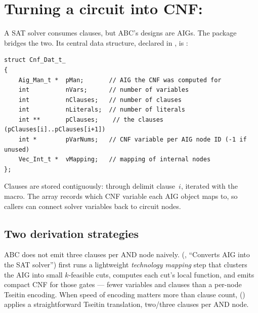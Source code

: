\section{Turning a circuit into CNF: }

A SAT solver consumes clauses, but ABC's designs are AIGs. The 
package bridges the two. Its central data structure, declared in
, is :

\begin{lstlisting}[style=abccode]
struct Cnf_Dat_t_
{
    Aig_Man_t *  pMan;       // AIG the CNF was computed for
    int          nVars;      // number of variables
    int          nClauses;   // number of clauses
    int          nLiterals;  // number of literals
    int **       pClauses;    // the clauses (pClauses[i]..pClauses[i+1])
    int *        pVarNums;   // CNF variable per AIG node ID (-1 if unused)
    Vec_Int_t *  vMapping;   // mapping of internal nodes
};
\end{lstlisting}

Clauses are stored contiguously:  through 
delimit clause~$i$, iterated with the  macro. The
 array records which CNF variable each AIG object maps to, so callers
can connect solver variables back to circuit nodes.

\subsection{Two derivation strategies}

ABC does not emit three clauses per AND node naively. 
(, ``Converts AIG into the SAT solver'') first runs a
lightweight \emph{technology mapping} step that clusters the AIG into small
$k$-feasible cuts, computes each cut's local function, and emits compact CNF for
those gates --- fewer variables and clauses than a per-node Tseitin encoding.
When speed of encoding matters more than clause count, 
() applies a straightforward Tseitin translation,
two/three clauses per AND node.

